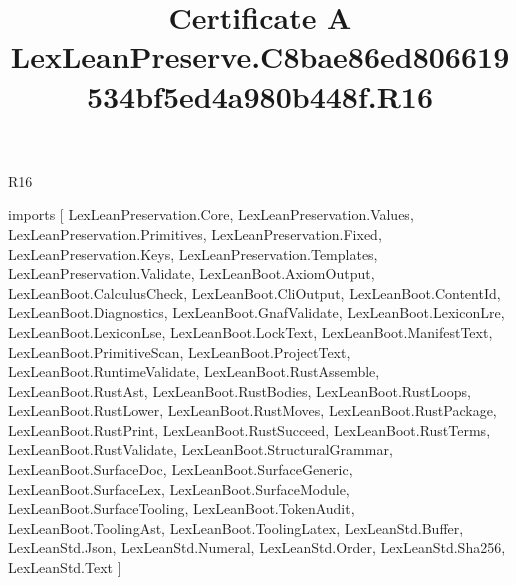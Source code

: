 \begin{lexlean}{R16}
\title{Certificate A LexLeanPreserve.C8bae86ed806619534bf5ed4a980b448f.R16}
\begin{coremodule}
imports [
  LexLeanPreservation.Core,
  LexLeanPreservation.Values,
  LexLeanPreservation.Primitives,
  LexLeanPreservation.Fixed,
  LexLeanPreservation.Keys,
  LexLeanPreservation.Templates,
  LexLeanPreservation.Validate,
  LexLeanBoot.AxiomOutput,
  LexLeanBoot.CalculusCheck,
  LexLeanBoot.CliOutput,
  LexLeanBoot.ContentId,
  LexLeanBoot.Diagnostics,
  LexLeanBoot.GnafValidate,
  LexLeanBoot.LexiconLre,
  LexLeanBoot.LexiconLse,
  LexLeanBoot.LockText,
  LexLeanBoot.ManifestText,
  LexLeanBoot.PrimitiveScan,
  LexLeanBoot.ProjectText,
  LexLeanBoot.RuntimeValidate,
  LexLeanBoot.RustAssemble,
  LexLeanBoot.RustAst,
  LexLeanBoot.RustBodies,
  LexLeanBoot.RustLoops,
  LexLeanBoot.RustLower,
  LexLeanBoot.RustMoves,
  LexLeanBoot.RustPackage,
  LexLeanBoot.RustPrint,
  LexLeanBoot.RustSucceed,
  LexLeanBoot.RustTerms,
  LexLeanBoot.RustValidate,
  LexLeanBoot.StructuralGrammar,
  LexLeanBoot.SurfaceDoc,
  LexLeanBoot.SurfaceGeneric,
  LexLeanBoot.SurfaceLex,
  LexLeanBoot.SurfaceModule,
  LexLeanBoot.SurfaceTooling,
  LexLeanBoot.TokenAudit,
  LexLeanBoot.ToolingAst,
  LexLeanBoot.ToolingLatex,
  LexLeanStd.Buffer,
  LexLeanStd.Json,
  LexLeanStd.Numeral,
  LexLeanStd.Order,
  LexLeanStd.Sha256,
  LexLeanStd.Text
]


\end{coremodule}
\end{lexlean}
